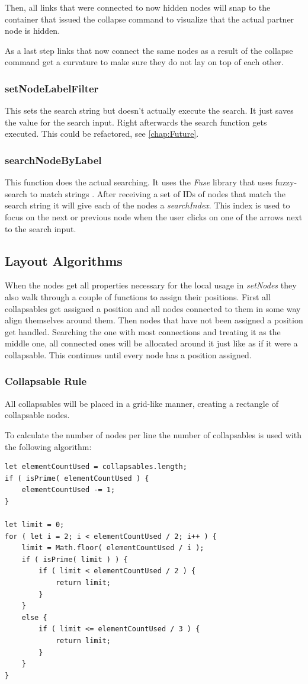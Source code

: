 Then, all links that were connected to now hidden nodes will snap to the container that issued the collapse command to visualize that the actual partner node is hidden.

As a last step links that now connect the same nodes as a result of the collapse command get a curvature to make sure they do not lay on top of each other.

\subsubsection{setNodeLabelFilter}
This sets the search string but doesn't actually execute the search. It just saves the value for the search input. Right afterwards the search function gets executed. This could be refactored, see \autoref{chap:Future}.

\subsubsection{searchNodeByLabel}
This function does the actual searching. It uses the \emph{Fuse} library that uses fuzzy-search to match strings \cite{Fuze}. After receiving a set of IDs of nodes that match the search string it will give each of the nodes a \emph{searchIndex}. This index is used to focus on the next or previous node when the user clicks on one of the arrows next to the search input.


\subsection{Layout Algorithms}
When the nodes get all properties necessary for the local usage in \emph{setNodes} they also walk through a couple of functions to assign their positions. First all collapsables get assigned a position and all nodes connected to them in some way align themselves around them. Then nodes that have not been assigned a position get handled. Searching the one with most connections and treating it as the middle one, all connected ones will be allocated around it just like as if it were a collapsable. This continues until every node has a position assigned.

\subsubsection{Collapsable Rule}
All collapsables will be placed in a grid-like manner, creating a rectangle of collapsable nodes.

To calculate the number of nodes per line the number of collapsables is used with the following algorithm:
\begin{lstlisting}
let elementCountUsed = collapsables.length;
if ( isPrime( elementCountUsed ) {
	elementCountUsed -= 1;
}

let limit = 0;
for ( let i = 2; i < elementCountUsed / 2; i++ ) {
	limit = Math.floor( elementCountUsed / i );
	if ( isPrime( limit ) ) {
		if ( limit < elementCountUsed / 2 ) {
			return limit;
		}
	}
	else {
		if ( limit <= elementCountUsed / 3 ) {
			return limit;
		} 
	}				
}
\end{lstlisting}

